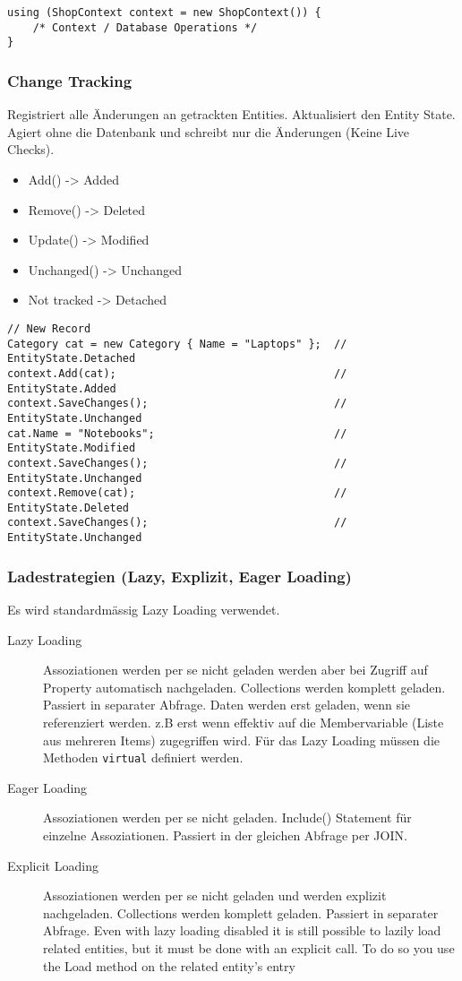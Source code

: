 \begin{lstlisting}
using (ShopContext context = new ShopContext()) {
    /* Context / Database Operations */
}
\end{lstlisting}

\subsubsection{Change Tracking}
Registriert alle Änderungen an getrackten Entities. Aktualisiert den Entity State. Agiert ohne die Datenbank und schreibt nur die Änderungen (Keine Live Checks).
\begin{itemize}
	\item Add() -> Added 
	\item Remove() -> Deleted
	\item Update() -> Modified
	\item Unchanged() -> Unchanged
	\item Not tracked -> Detached
\end{itemize}

\begin{lstlisting}
// New Record
Category cat = new Category { Name = "Laptops" };  // EntityState.Detached
context.Add(cat);                                  // EntityState.Added
context.SaveChanges();                             // EntityState.Unchanged
cat.Name = "Notebooks";                            // EntityState.Modified
context.SaveChanges();                             // EntityState.Unchanged
context.Remove(cat);                               // EntityState.Deleted
context.SaveChanges();                             // EntityState.Unchanged
\end{lstlisting}

\subsubsection{Ladestrategien (Lazy, Explizit, Eager Loading)}
Es wird standardmässig Lazy Loading verwendet. \\
\begin{description}
	\item[Lazy Loading] Assoziationen werden per se nicht geladen werden aber bei Zugriff auf Property automatisch nachgeladen. Collections werden komplett geladen. Passiert in separater Abfrage.
	Daten werden erst geladen, wenn sie referenziert werden. z.B erst wenn effektiv auf die Membervariable (Liste aus mehreren Items) zugegriffen wird. Für das Lazy Loading müssen die Methoden \lstinline|virtual| definiert werden. 
	\item[Eager Loading] Assoziationen werden per se nicht geladen. Include() Statement für einzelne Assoziationen. Passiert in der gleichen Abfrage per JOIN.
	\item[Explicit Loading] Assoziationen werden per se nicht geladen und werden explizit nachgeladen. Collections werden komplett geladen. Passiert in separater Abfrage.
	Even with lazy loading disabled it is still possible to lazily load related entities, but it must be done with an explicit call. To do so you use the Load method on the related entity’s entry
\end{description}

